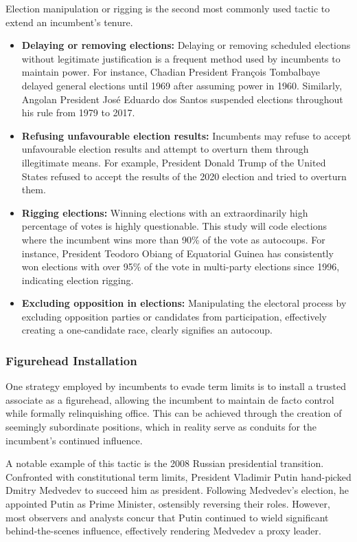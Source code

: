 \documentclass[
  12pt,
]{report}
\begin{document}
Election manipulation or rigging is the second most commonly used tactic
to extend an incumbent's tenure.

\begin{itemize}
\item
  \textbf{Delaying or removing elections:} Delaying or removing
  scheduled elections without legitimate justification is a frequent
  method used by incumbents to maintain power. For instance, Chadian
  President François Tombalbaye delayed general elections until 1969
  after assuming power in 1960. Similarly, Angolan President José
  Eduardo dos Santos suspended elections throughout his rule from 1979
  to 2017.
\item
  \textbf{Refusing unfavourable election results:} Incumbents may refuse
  to accept unfavourable election results and attempt to overturn them
  through illegitimate means. For example, President Donald Trump of the
  United States refused to accept the results of the 2020 election and
  tried to overturn them.
\item
  \textbf{Rigging elections:} Winning elections with an extraordinarily
  high percentage of votes is highly questionable. This study will code
  elections where the incumbent wins more than 90\% of the vote as
  autocoups. For instance, President Teodoro Obiang of Equatorial Guinea
  has consistently won elections with over 95\% of the vote in
  multi-party elections since 1996, indicating election rigging.
\item
  \textbf{Excluding opposition in elections:} Manipulating the electoral
  process by excluding opposition parties or candidates from
  participation, effectively creating a one-candidate race, clearly
  signifies an autocoup.
\end{itemize}

\subsubsection*{Figurehead Installation}\label{figurehead-installation}

One strategy employed by incumbents to evade term limits is to install a
trusted associate as a figurehead, allowing the incumbent to maintain de
facto control while formally relinquishing office. This can be achieved
through the creation of seemingly subordinate positions, which in
reality serve as conduits for the incumbent's continued influence.

A notable example of this tactic is the 2008 Russian presidential
transition. Confronted with constitutional term limits, President
Vladimir Putin hand-picked Dmitry Medvedev to succeed him as president.
Following Medvedev's election, he appointed Putin as Prime Minister,
ostensibly reversing their roles. However, most observers and analysts
concur that Putin continued to wield significant behind-the-scenes
influence, effectively rendering Medvedev a proxy leader.
\end{document}
